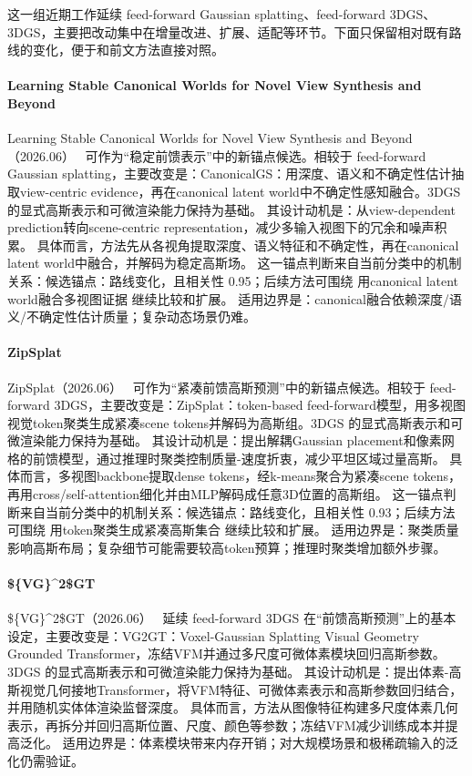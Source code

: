 这一组近期工作延续 feed-forward Gaussian splatting、feed-forward 3DGS、3DGS，主要把改动集中在增量改进、扩展、适配等环节。下面只保留相对既有路线的变化，便于和前文方法直接对照。

\paragraph{Learning Stable Canonical Worlds for Novel View Synthesis and Beyond}
Learning Stable Canonical Worlds for Novel View Synthesis and Beyond（2026.06）~\cite{2606_23027} 可作为“稳定前馈表示”中的新锚点候选。相较于 feed-forward Gaussian splatting，主要改变是：CanonicalGS：用深度、语义和不确定性估计抽取view-centric evidence，再在canonical latent world中不确定性感知融合。3DGS 的显式高斯表示和可微渲染能力保持为基础。
其设计动机是：从view-dependent prediction转向scene-centric representation，减少多输入视图下的冗余和噪声积累。
具体而言，方法先从各视角提取深度、语义特征和不确定性，再在canonical latent world中融合，并解码为稳定高斯场。
这一锚点判断来自当前分类中的机制关系：候选锚点：路线变化，且相关性 0.95；后续方法可围绕 用canonical latent world融合多视图证据 继续比较和扩展。
适用边界是：canonical融合依赖深度/语义/不确定性估计质量；复杂动态场景仍难。

\paragraph{ZipSplat}
ZipSplat（2026.06）~\cite{2606_05102} 可作为“紧凑前馈高斯预测”中的新锚点候选。相较于 feed-forward 3DGS，主要改变是：ZipSplat：token-based feed-forward模型，用多视图视觉token聚类生成紧凑scene tokens并解码为高斯组。3DGS 的显式高斯表示和可微渲染能力保持为基础。
其设计动机是：提出解耦Gaussian placement和像素网格的前馈模型，通过推理时聚类控制质量-速度折衷，减少平坦区域过量高斯。
具体而言，多视图backbone提取dense tokens，经k-means聚合为紧凑scene tokens，再用cross/self-attention细化并由MLP解码成任意3D位置的高斯组。
这一锚点判断来自当前分类中的机制关系：候选锚点：路线变化，且相关性 0.93；后续方法可围绕 用token聚类生成紧凑高斯集合 继续比较和扩展。
适用边界是：聚类质量影响高斯布局；复杂细节可能需要较高token预算；推理时聚类增加额外步骤。

\paragraph{\$\text\{VG\}\textasciicircum{}2\$GT}
\$\text\{VG\}\textasciicircum{}2\$GT（2026.06）~\cite{2606_01573} 延续 feed-forward 3DGS 在“前馈高斯预测”上的基本设定，主要改变是：VG2GT：Voxel-Gaussian Splatting Visual Geometry Grounded Transformer，冻结VFM并通过多尺度可微体素模块回归高斯参数。3DGS 的显式高斯表示和可微渲染能力保持为基础。
其设计动机是：提出体素-高斯视觉几何接地Transformer，将VFM特征、可微体素表示和高斯参数回归结合，并用随机实体体渲染监督深度。
具体而言，方法从图像特征构建多尺度体素几何表示，再拆分并回归高斯位置、尺度、颜色等参数；冻结VFM减少训练成本并提高泛化。
适用边界是：体素模块带来内存开销；对大规模场景和极稀疏输入的泛化仍需验证。

